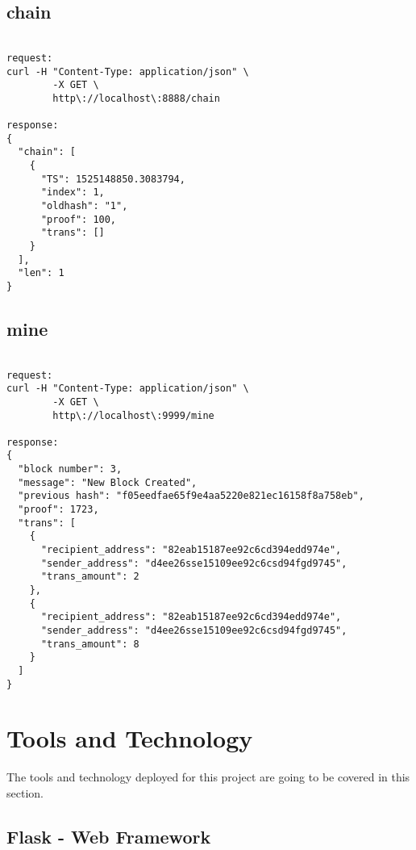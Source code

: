\subsection{chain}

\bigskip
\noindent
\begin{footnotesize}
\begin{verbatim}

request:
curl -H "Content-Type: application/json" \
        -X GET \
        http\://localhost\:8888/chain
        
response:
{
  "chain": [
    {
      "TS": 1525148850.3083794,
      "index": 1,
      "oldhash": "1",
      "proof": 100,
      "trans": []
    }
  ],
  "len": 1
}

\end{verbatim}
\end{footnotesize}

\subsection{mine}

\bigskip
\noindent
\begin{footnotesize}
\begin{verbatim}

request:
curl -H "Content-Type: application/json" \
        -X GET \
        http\://localhost\:9999/mine
        
response:
{
  "block number": 3,
  "message": "New Block Created",
  "previous hash": "f05eedfae65f9e4aa5220e821ec16158f8a758eb",
  "proof": 1723,
  "trans": [
    {
      "recipient_address": "82eab15187ee92c6cd394edd974e",
      "sender_address": "d4ee26sse15109ee92c6csd94fgd9745",
      "trans_amount": 2
    },
    {
      "recipient_address": "82eab15187ee92c6cd394edd974e",
      "sender_address": "d4ee26sse15109ee92c6csd94fgd9745",
      "trans_amount": 8
    }
  ]
}

\end{verbatim}
\end{footnotesize}

\section{Tools and Technology}

The tools and technology deployed for this project are going to be covered in 
this section.

\subsection{Flask - Web Framework}

